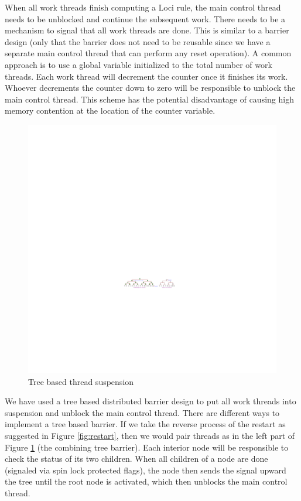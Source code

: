 \documentclass{article}
\begin{document}
When all work threads finish computing a Loci rule, the main control
thread needs to be unblocked and continue the subsequent work.  There
needs to be a mechanism to signal that all work threads are done.
This is similar to a barrier design (only that the barrier does not
need to be reusable since we have a separate main control thread that
can perform any reset operation).  A common approach is to use a
global variable initialized to the total number of work threads.  Each
work thread will decrement the counter once it finishes its work.
Whoever decrements the counter down to zero will be responsible to
unblock the main control thread.  This scheme has the potential
disadvantage of causing high memory contention at the location of the
counter variable.

\begin{figure}%
  \begin{center}
    \includegraphics[width=\textwidth]{barrier}
    \caption{Tree based thread suspension\label{fig:barrier}}
  \end{center}
\end{figure}

We have used a tree based distributed barrier design to put all work
threads into suspension and unblock the main control thread.  There
are different ways to implement a tree based barrier.  If we take the
reverse process of the restart as suggested in Figure
\ref{fig:restart}, then we would pair threads as in the left part of
Figure \ref{fig:barrier} (the combining tree barrier).  Each interior
node will be responsible to check the status of its two children.
When all children of a node are done (signaled via spin lock protected
flags), the node then sends the signal upward the tree until the root
node is activated, which then unblocks the main control thread.
\end{document}
